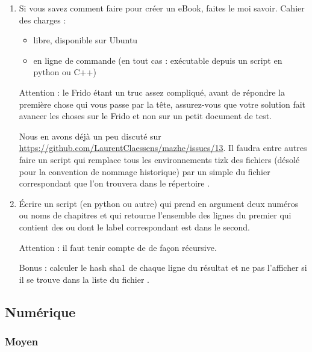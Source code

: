 \begin{enumerate}
    \item
        Si vous savez comment faire  pour créer un eBook, faites le moi savoir. Cahier des charges :
        \begin{itemize}
            \item libre, disponible sur Ubuntu
            \item en ligne de commande (en tout cas : exécutable depuis un script en python ou C++)
        \end{itemize}
        Attention : le Frido étant un truc assez compliqué, avant de répondre la première chose qui vous passe par la tête, assurez-vous que votre solution fait avancer les choses sur le Frido et non sur un petit document de test.

        Nous en avons déjà un peu discuté sur \url{https://github.com/LaurentClaessens/mazhe/issues/13}. Il faudra entre autres faire un script qui remplace tous les environnements tizk des fichiers  (désolé pour la convention de nommage historique) par un simple  du fichier  correspondant que l'on trouvera dans le répertoire .
    \item
        Écrire un script (en python ou autre) qui prend en argument deux numéros ou noms de chapitres et qui retourne l'ensemble des lignes du premier qui contient des  ou  dont le label correspondant est dans le second.

        Attention : il faut tenir compte de  de façon récursive.

        Bonus : calculer le hash sha1 de chaque ligne du résultat et ne pas l'afficher si il se trouve dans la liste du fichier .
\end{enumerate}

\subsection{Numérique}

\subsubsection{Moyen}

